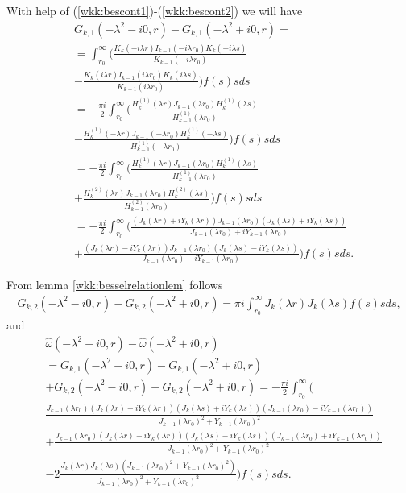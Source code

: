 \documentclass[manuscript, printscheme]{paper}
\begin{document}
With help of (\ref{wkk:bescont1})-(\ref{wkk:bescont2}) we will have
\begin{align*}
&G_{k,1}(-\lambda^2-i0,r)  - G_{k,1}(-\lambda^2+i0,r) = \\
&=\int_{r_0}^\infty \Big ( \frac{K_k(-i\lambda r) I_{k-1}(-i\lambda r_0)K_k(-i\lambda s)}{K_{k-1}(-i\lambda r_0)} \\
&- \frac{K_k(i\lambda r) I_{k-1}(i\lambda r_0)K_k(i\lambda s)}{K_{k-1}(i\lambda r_0)} \Big ) f(s)  s ds \nonumber \\
&=-\frac{\pi i}2 \int_{r_0}^\infty \Big ( \frac{H_k^{(1)}(\lambda r) J_{k-1}(\lambda r_0)H_k^{(1)}(\lambda s)}{H_{k-1}^{(1)}(\lambda r_0)} \\
&-  \frac{H_k^{(1)}(-\lambda r) J_{k-1}(-\lambda r_0)H_k^{(1)}(-\lambda s)}{H_{k-1}^{(1)}(-\lambda r_0)}
\Big ) f(s)  s ds \nonumber \\
&=-\frac{\pi i}2 \int_{r_0}^\infty \Big ( \frac{H_k^{(1)}(\lambda r) J_{k-1}(\lambda r_0)H_k^{(1)}(\lambda s)}{H_{k-1}^{(1)}(\lambda r_0)} \\
&+  \frac{H_k^{(2)}(\lambda r) J_{k-1}(\lambda r_0)H_k^{(2)}(\lambda s)}{H_{k-1}^{(2)}(\lambda r_0)}
\Big ) f(s)  s ds \nonumber \\
&=-\frac{\pi i}2 \int_{r_0}^\infty  \Big ( \frac{(J_k(\lambda r)+iY_k(\lambda r)) J_{k-1}(\lambda r_0)(J_k(\lambda s)+iY_k(\lambda s))}{J_{k-1}(\lambda r_0)+iY_{k-1}(\lambda r_0)} \\ 
& + \frac{(J_k(\lambda r)-iY_k(\lambda r)) J_{k-1}(\lambda r_0)(J_k(\lambda s)-iY_k(\lambda s))}{J_{k-1}(\lambda r_0)-iY_{k-1}(\lambda r_0)}  \Big ) f(s)  s ds.
\nonumber
\end{align*}

From lemma \ref{wkk:besselrelationlem} follows 
\begin{align*}
G_{k,2}(-\lambda^2-i0,r)  - G_{k,2}(-\lambda^2+i0,r) = \pi i \int_{r_0}^\infty J_k(\lambda r) J_k(\lambda s) f(s) s ds,
\end{align*}
and
\begin{align*}&\hat \omega(-\lambda^2-i0,r) - \hat \omega(-\lambda^2+i0,r) \nonumber \\ 
&=G_{k,1}(-\lambda^2-i0,r)  - G_{k,1}(-\lambda^2+i0,r) \nonumber \\
&+ G_{k,2}(-\lambda^2-i0,r)  - G_{k,2}(-\lambda^2+i0,r)   
=-\frac{\pi i}2 \int_{r_0}^\infty \Big ( \\ & \frac{J_{k-1}(\lambda r_0)(J_k(\lambda r)+iY_k(\lambda r)) (J_k(\lambda s)+iY_k(\lambda s)) (J_{k-1}(\lambda r_0)-iY_{k-1}(\lambda r_0) )}{J_{k-1}(\lambda r_0)^2+Y_{k-1}(\lambda r_0)^2}\\
&+ \frac{J_{k-1}(\lambda r_0)(J_k(\lambda r)-iY_k(\lambda r)) (J_k(\lambda s)-iY_k(\lambda s))(J_{k-1}(\lambda r_0)+iY_{k-1}(\lambda r_0))}{J_{k-1}(\lambda r_0)^2+Y_{k-1}(\lambda r_0)^2}
\\
&-2\frac {J_k(\lambda r) J_k(\lambda s) (J_{k-1}(\lambda r_0)^2+Y_{k-1}(\lambda r_0)^2)} {J_{k-1}(\lambda r_0)^2+Y_{k-1}(\lambda r_0)^2} \Big )  f(s) s ds.\\
\end{align*}
\end{document}
